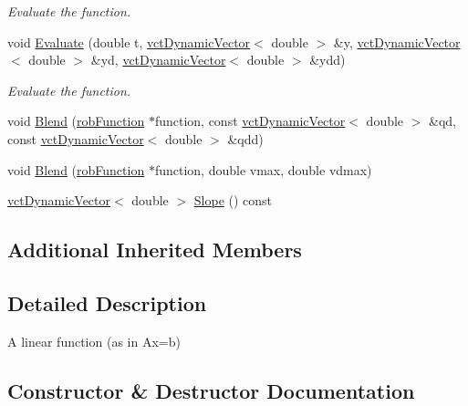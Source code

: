 \begin{DoxyCompactItemize}
\begin{DoxyCompactList}\small\item\em Evaluate the function. \end{DoxyCompactList}\item 
void \hyperlink{classrob_linear_rn_a44d7200fe3a9a71640c3fbbaf6e597bf}{Evaluate} (double t, \hyperlink{classvct_dynamic_vector}{vct\+Dynamic\+Vector}$<$ double $>$ \&y, \hyperlink{classvct_dynamic_vector}{vct\+Dynamic\+Vector}$<$ double $>$ \&yd, \hyperlink{classvct_dynamic_vector}{vct\+Dynamic\+Vector}$<$ double $>$ \&ydd)
\begin{DoxyCompactList}\small\item\em Evaluate the function. \end{DoxyCompactList}\item 
void \hyperlink{classrob_linear_rn_a9ae5c744e72423e4140f6138bb3a6123}{Blend} (\hyperlink{classrob_function}{rob\+Function} $\ast$function, const \hyperlink{classvct_dynamic_vector}{vct\+Dynamic\+Vector}$<$ double $>$ \&qd, const \hyperlink{classvct_dynamic_vector}{vct\+Dynamic\+Vector}$<$ double $>$ \&qdd)
\item 
void \hyperlink{classrob_linear_rn_a445a28f3de29309411ed11546b02841a}{Blend} (\hyperlink{classrob_function}{rob\+Function} $\ast$function, double vmax, double vdmax)
\item 
\hyperlink{classvct_dynamic_vector}{vct\+Dynamic\+Vector}$<$ double $>$ \hyperlink{classrob_linear_rn_aa1edb8aba4f443ad31771a9f1cba0d86}{Slope} () const 
\end{DoxyCompactItemize}
\subsection*{Additional Inherited Members}


\subsection{Detailed Description}
A linear function (as in Ax=b) 

\subsection{Constructor \& Destructor Documentation}
\hypertarget{classrob_linear_rn_a85534f130d03d7b490b56248a661621e}{}
